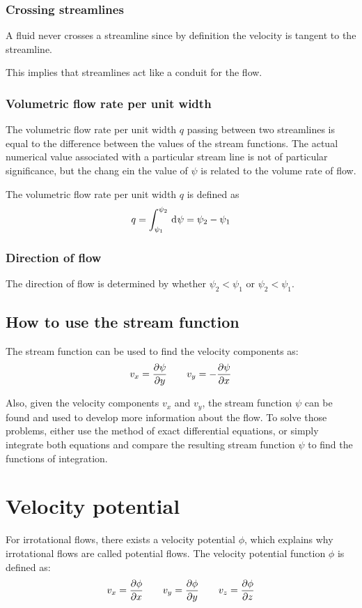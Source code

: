 \documentclass[10pt, twocolumn]{article}
\begin{document}
\subsubsection{Crossing streamlines}
A fluid never crosses a streamline since by definition the velocity is tangent to the streamline.

This implies that streamlines act like a conduit for the flow.


\subsubsection{Volumetric flow rate per unit width}
The volumetric flow rate per unit width \(q\) passing between two streamlines is equal to the difference between the values of the stream functions.
The actual numerical value associated with a particular stream line is not of particular significance, but the chang ein the value of \(\psi\) is related to the volume rate of flow.

The volumetric flow rate per unit width \(q\) is defined as
\[
  q = \int_{\psi_1}^{\psi_2}{\,\mathrm{d}^{} \psi} = \psi_2 - \psi_1
\]


\subsubsection{Direction of flow}
The direction of flow is determined by whether \(\psi_2 < \psi_1\) or \(\psi_2 < \psi_1\).


\subsection{How to use the stream function}
The stream function can be used to find the velocity components as:
\[
  v_x = \frac{\partial \psi}{\partial y} \qquad v_y = - \frac{\partial \psi}{\partial x}
\]

Also, given the velocity components \(v_x\) and \(v_y\), the stream function \(\psi\) can be found and used to develop more information about the flow.
To solve those problems, either use the method of exact differential equations, or simply integrate both equations and compare the resulting stream function \(\psi\) to find the functions of integration.


\section{Velocity potential}
For irrotational flows, there exists a velocity potential \(\phi\), which explains why irrotational flows are called potential flows.
The velocity potential function \(\phi\) is defined as:
\[
  v_x = \frac{\partial \phi}{\partial x} \qquad v_y = \frac{\partial \phi}{\partial y} \qquad v_z = \frac{\partial \phi}{\partial z}
\]
\end{document}
